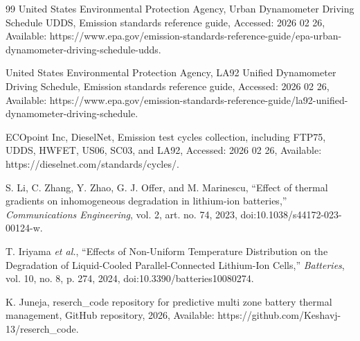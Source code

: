 \documentclass[twocolumn]{article}
\begin{document}
\begin{thebibliography}{99}
United States Environmental Protection Agency,
Urban Dynamometer Driving Schedule UDDS,
Emission standards reference guide,
Accessed: 2026 02 26,
Available: https://www.epa.gov/emission-standards-reference-guide/epa-urban-dynamometer-driving-schedule-udds.

United States Environmental Protection Agency,
LA92 Unified Dynamometer Driving Schedule,
Emission standards reference guide,
Accessed: 2026 02 26,
Available: https://www.epa.gov/emission-standards-reference-guide/la92-unified-dynamometer-driving-schedule.

ECOpoint Inc, DieselNet,
Emission test cycles collection, including FTP75, UDDS, HWFET, US06, SC03, and LA92,
Accessed: 2026 02 26,
Available: https://dieselnet.com/standards/cycles/.

S. Li, C. Zhang, Y. Zhao, G. J. Offer, and M. Marinescu, ``Effect of thermal gradients on inhomogeneous degradation in lithium-ion batteries,'' \textit{Communications Engineering}, vol. 2, art. no. 74, 2023, doi:10.1038/s44172-023-00124-w.

T. Iriyama \textit{et al.}, ``Effects of Non-Uniform Temperature Distribution on the Degradation of Liquid-Cooled Parallel-Connected Lithium-Ion Cells,'' \textit{Batteries}, vol. 10, no. 8, p. 274, 2024, doi:10.3390/batteries10080274.

K. Juneja,
reserch_code repository for predictive multi zone battery thermal management,
GitHub repository,
2026,
Available: https://github.com/Keshavj-13/reserch_code.
\end{thebibliography}
\end{document}
